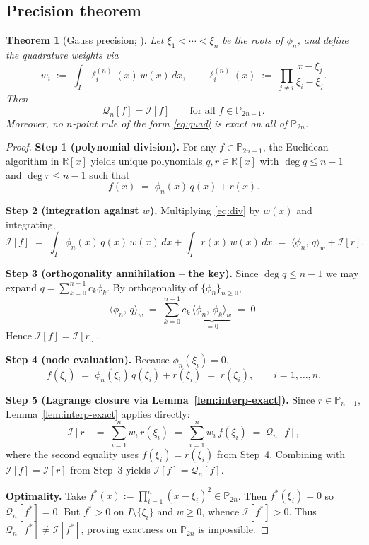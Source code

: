 \documentclass[11pt,a4paper]{article}
\newtheorem{theorem}{Theorem}[section]
\theoremstyle{definition}
\newcommand{\R}{\mathbb{R}}
\newcommand{\PP}{\mathbb{P}}
\newcommand{\ipw}[2]{\langle #1,\, #2 \rangle_{w}}
\newcommand{\I}{\mathcal{I}}
\newcommand{\Q}{\mathcal{Q}}
\begin{document}
\subsection{Precision theorem}

\begin{theorem}[Gauss precision; \cite{Gauss1814,Stroud1971}]\label{thm:gauss}
Let $\xi_1<\cdots<\xi_n$ be the roots of $\phi_n$, and define the quadrature
weights via
\begin{equation}
  w_i \;:=\; \int_I \ell_i^{(n)}(x)\,w(x)\,dx,
  \qquad
  \ell_i^{(n)}(x) \;:=\; \prod_{j\neq i}\frac{x-\xi_j}{\xi_i-\xi_j}.
  \label{eq:weights}
\end{equation}
Then
\[
  \Q_n[f]=\I[f]
  \qquad\text{for all } f\in\PP_{2n-1}.
\]
Moreover, no $n$-point rule of the form \eqref{eq:quad} is exact on all of
$\PP_{2n}$.
\end{theorem}

\begin{proof}
\textbf{Step 1 (polynomial division).} For any $f\in\PP_{2n-1}$, the Euclidean
algorithm in $\R[x]$ yields unique polynomials $q,r\in\R[x]$ with
$\deg q\le n-1$ and $\deg r\le n-1$ such that
\begin{equation}
  f(x) \;=\; \phi_n(x)\,q(x) + r(x).
  \label{eq:div}
\end{equation}

\textbf{Step 2 (integration against $w$).} Multiplying \eqref{eq:div} by
$w(x)$ and integrating,
\begin{equation}
  \I[f] \;=\; \int_I \phi_n(x)\,q(x)\,w(x)\,dx + \int_I r(x)\,w(x)\,dx
        \;=\; \ipw{\phi_n}{q} + \I[r].
  \label{eq:int-split}
\end{equation}

\textbf{Step 3 (orthogonality annihilation -- the key).} Since $\deg q\le n-1$
we may expand $q=\sum_{k=0}^{n-1}c_k\phi_k$. By orthogonality of
$\{\phi_n\}_{n\ge 0}$,
\[
  \ipw{\phi_n}{q}
  \;=\; \sum_{k=0}^{n-1} c_k\,\underbrace{\ipw{\phi_n}{\phi_k}}_{=0}
  \;=\; 0.
\]
Hence $\I[f]=\I[r]$.

\textbf{Step 4 (node evaluation).} Because $\phi_n(\xi_i)=0$,
\[
  f(\xi_i) \;=\; \phi_n(\xi_i)\,q(\xi_i)+r(\xi_i) \;=\; r(\xi_i),
  \qquad i=1,\ldots,n.
\]

\textbf{Step 5 (Lagrange closure via Lemma~\ref{lem:interp-exact}).}
Since $r\in\PP_{n-1}$, Lemma~\ref{lem:interp-exact} applies directly:
\[
  \I[r] \;=\; \sum_{i=1}^n w_i\,r(\xi_i) \;=\; \sum_{i=1}^n w_i\,f(\xi_i)
        \;=\; \Q_n[f],
\]
where the second equality uses $f(\xi_i)=r(\xi_i)$ from Step~4. Combining
with $\I[f]=\I[r]$ from Step~3 yields $\I[f]=\Q_n[f]$.

\textbf{Optimality.} Take $f^*(x):=\prod_{i=1}^n(x-\xi_i)^2\in\PP_{2n}$.
Then $f^*(\xi_i)=0$ so $\Q_n[f^*]=0$. But $f^*>0$ on $I\setminus\{\xi_i\}$ and
$w\ge0$, whence $\I[f^*]>0$. Thus $\Q_n[f^*]\neq\I[f^*]$, proving exactness on
$\PP_{2n}$ is impossible.
\end{proof}
\end{document}
